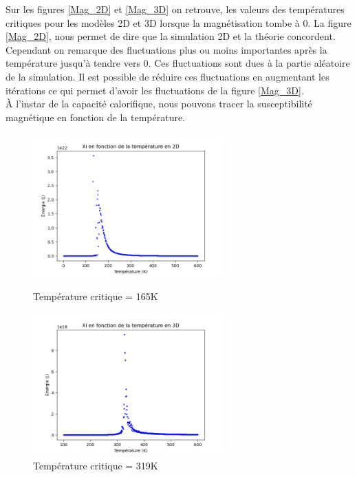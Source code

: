 \documentclass{article}
\begin{document}
Sur les figures \ref{Mag_2D} et \ref{Mag_3D} on retrouve, les valeurs des températures critiques pour les modèles 2D et 3D lorsque la magnétisation tombe à 0. La figure \ref{Mag_2D}, nous permet de dire que la simulation 2D et la théorie concordent. Cependant on remarque des fluctuations plus ou moins importantes après la température jusqu'à tendre vers 0. Ces fluctuations sont dues à la partie aléatoire de la simulation. Il est possible de réduire ces fluctuations en augmentant les itérations ce qui permet d'avoir les fluctuations de la figure \ref{Mag_3D}. \\

À  l'instar de la capacité calorifique, nous pouvons tracer la susceptibilité magnétique en fonction de la température. 

\begin{figure}[ht]
  \centering
  \begin{minipage}[b]{0.45\textwidth}
    \includegraphics[height=5.5cm]{Mag/Xi_en_2D.png}
    \caption{Température critique = 165K}
    \label{Xi_2D}
  \end{minipage}
  \hspace{0.5cm}
  \begin{minipage}[b]{0.45\textwidth}
    \includegraphics[height=5.5cm]{Mag/Xi_en_3D.png}
    \caption{Température critique = 319K}
    \label{Xi_3D}
  \end{minipage}
\end{figure}
\end{document}

